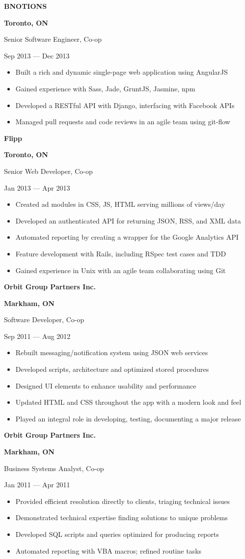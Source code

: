 \documentclass[11pt, letterpaper]{article}
\def\trim#1{\ignorespaces#1\unskip}
\newcommand{\itemtitle}[2]
{ %
  \begin{minipage}[b]{0.7\hsize}
    \begin{flushleft}
      \bfseries
      \trim{#1}
    \end{flushleft}
  \end{minipage}
  \hfill
  \begin{minipage}[b]{0.3\hsize}
    \begin{flushright}
      \bfseries
      \trim{#2}
    \end{flushright}
  \end{minipage}
  \vspace{0.3em}
}
\newcommand{\itemdetail}[2]
{ %
  \begin{minipage}[b]{0.7\hsize}
    \begin{flushleft}
      \trim{#1}
    \end{flushleft}
  \end{minipage}
  \hfill
  \begin{minipage}[b]{0.3\hsize}
    \begin{flushright}
      \trim{#2}
    \end{flushright}
  \end{minipage}
  \vspace{-1em}
}
\begin{document}
\itemtitle{ BNOTIONS }{ Toronto, ON }
\itemdetail{ Senior Software Engineer, Co-op }{ Sep 2013 --- Dec 2013 }
\begin{itemize}
  \item Built a rich and dynamic single-page web application using AngularJS
  \item Gained experience with Sass, Jade, GruntJS, Jasmine, npm
  \item Developed a RESTful API with Django, interfacing with Facebook APIs
  \item Managed pull requests and code reviews in an agile team using git-flow
\end{itemize}

\itemtitle{ Flipp }{ Toronto, ON }
\itemdetail{ Senior Web Developer, Co-op }{ Jan 2013 --- Apr 2013 }
\begin{itemize}
  \item Created ad modules in CSS, JS, HTML serving millions of views/day
  \item Developed an authenticated API for returning JSON, RSS, and XML data
  \item Automated reporting by creating a wrapper for the Google Analytics API
  \item Feature development with Rails, including RSpec test cases and TDD
  \item Gained experience in Unix with an agile team collaborating using Git
\end{itemize}

\itemtitle{ Orbit Group Partners Inc. }{ Markham, ON }
\itemdetail{ Software Developer, Co-op }{ Sep 2011 --- Aug 2012 }
\begin{itemize}
  \item Rebuilt messaging/notification system using JSON web services
  \item Developed scripts, architecture and optimized stored procedures
  \item Designed UI elements to enhance usability and performance
  \item Updated HTML and CSS throughout the app with a modern look and feel
  \item Played an integral role in developing, testing, documenting a major release
\end{itemize}

\itemtitle{ Orbit Group Partners Inc. }{ Markham, ON }
\itemdetail{ Business Systems Analyst, Co-op }{ Jan 2011 --- Apr 2011 }
\begin{itemize}
  \item Provided efficient resolution directly to clients, triaging technical issues
  \item Demonstrated technical expertise finding solutions to unique problems
  \item Developed SQL scripts and queries optimized for producing reports
  \item Automated reporting with VBA macros; refined routine tasks
\end{itemize}
\end{document}
